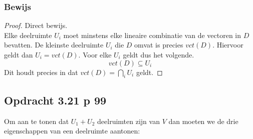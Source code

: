 \documentclass[lineaire_algebra_oplossingen.tex]{subfiles}
\begin{document}
\subsubsection*{Bewijs}
\begin{proof}
Direct bewijs.\\
Elke deelruimte $U_i$ moet minstens elke lineaire combinatie van de vectoren in $D$ bevatten.
De kleinste deelruimte $U_i$ die $D$ omvat is precies $vct(D)$. Hiervoor geldt dan $U_i = vct(D)$.
Voor elke $U_i$ geldt dus het volgende.
\[
vct(D) \subseteq U_i 
\]
Dit houdt precies in dat $vct(D) = \displaystyle\bigcap_iU_i$ geldt.
\end{proof}


\subsection{Opdracht 3.21 p 99}
\label{3.21}
Om aan te tonen dat $U_1 + U_2$ deelruimten zijn van $V$ dan moeten we de drie eigenschappen van een deelruimte aantonen:
\end{document}
